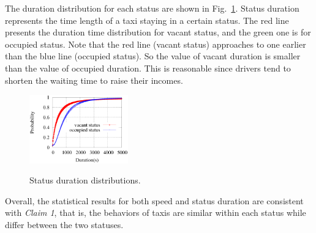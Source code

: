 The duration distribution for each status are shown in Fig.~\ref{figure_duration_for_each_status}. Status duration represents the time length of a taxi staying in a certain status. The red line presents the duration time distribution for vacant status, and the green one is for occupied status. Note that the red line (vacant status) approaches to  one earlier than the blue line (occupied status). So the value of vacant duration is smaller than the value of occupied duration. This is reasonable since drivers tend to shorten the waiting time to raise their incomes.
\begin{figure}[!h]
\centering
\includegraphics[width=0.38\textwidth]{figures/assumption/durationdis.eps}\\
\caption{Status duration distributions.}\label{figure_duration_for_each_status}
\end{figure}

Overall, the statistical results for both speed and status duration are consistent with \emph{Claim 1}, that is, the behaviors of taxis are similar within each status while differ between the two statuses.
